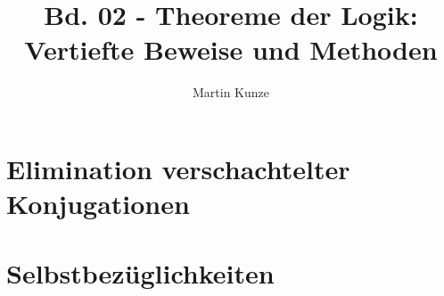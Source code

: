 \documentclass[main.tex]{subfiles}
\title{Bd. 02 - Theoreme der Logik: Vertiefte Beweise und Methoden}
\author{Martin Kunze}
\date{}
\begin{document}
\maketitle
\tableofcontents
\setcounter{file}{2}

\chapter{Elimination verschachtelter Konjugationen}

\begin{tabproof}
\end{tabproof}

\begin{tabproof}
\end{tabproof}

\begin{tabproof}
\end{tabproof}

\begin{tabproof}
\end{tabproof}

\chapter{Selbstbezüglichkeiten}

\begin{tabproof}
\end{tabproof}

\begin{tabproof}
\end{tabproof}

\end{document}
